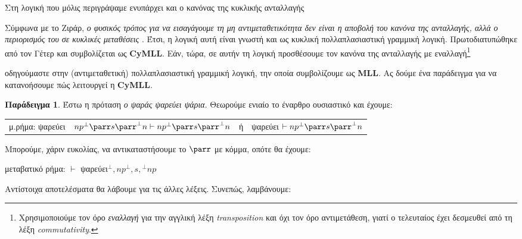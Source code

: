 \documentclass [a4paper,11pt] {book}
\theoremstyle{definition}
\newtheorem{example}[theorem]{Παράδειγμα}
\theoremstyle{definition}
\begin{document}
Στη λογική που μόλις περιγράψαμε ενυπάρχει και ο κανόνας της κυκλικής ανταλλαγής
\begin{prooftree}
\end{prooftree}
Σύμφωνα με το Ζιράρ, \textit{ο φυσικός τρόπος για να εισαγάγουμε τη μη αντιμεταθετικότητα δεν είναι η αποβολή του κανόνα της ανταλλαγής, αλλά ο περιορισμός του σε κυκλικές μεταθέσεις} \citep{Girard:1989:PT:64805}. Έτσι, η λογική αυτή είναι γνωστή και ως κυκλική πολλαπλασιαστική γραμμική λογική. Πρωτοδιατυπώθηκε από τον Γέτερ \citep{Yetter1990} και συμβολίζεται ως \textbf{CyMLL}. Εάν, τώρα, σε αυτήν τη λογική προσθέσουμε τον κανόνα της ανταλλαγής με εναλλαγή\footnote{Χρησιμοποιούμε τον όρο \textit{εναλλαγή} για την αγγλική λέξη \textit{transposition} και όχι τον όρο αντιμετάθεση, γιατί ο τελευταίος έχει δεσμευθεί από τη λέξη \textit{commutativity}.}
\begin{prooftree}
\end{prooftree}
οδηγούμαστε στην (αντιμεταθετική) πολλαπλασιαστική γραμμική λογική, την οποία συμβολίζουμε ως \textbf{MLL}. Ας δούμε ένα παράδειγμα για να κατανοήσουμε πώς λειτουργεί η \textbf{CyMLL}.
\begin{example}
\label{exampleCyMLL}
Έστω η πρόταση \textit{ο ψαράς ψαρεύει ψάρια}. Θεωρούμε ενιαίο το έναρθρο ουσιαστικό και έχουμε:
\begin{center}
\begin{tabular}{llll}
μ.ρήμα: ψαρεύει & $np^{\bot}\parr s\parr^{\bot}n\vdash np^{\bot}\parr s\parr^{\bot}n$ & ή & ψαρεύει $\vdash np^{\bot}\parr s\parr^{\bot}n$
\end{tabular}\end{center}
Μπορούμε, χάριν ευκολίας, να αντικαταστήσουμε το $\parr$ με κόμμα, οπότε θα έχουμε:
\begin{flushleft}
μεταβατικό ρήμα: $\vdash$ ψαρεύει$^{\bot},np^{\bot},s,{}^{\bot}np$
\end{flushleft}
Αντίστοιχα αποτελέσματα θα λάβουμε για τις άλλες λέξεις. Συνεπώς, λαμβάνουμε:
\begin{prooftree}
\end{prooftree}

\end{example}
\end{document}
